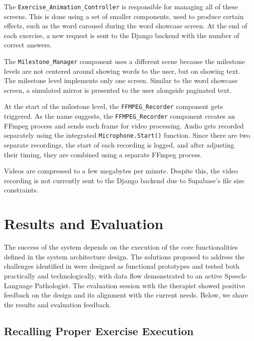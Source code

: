 The \texttt{Exercise\_Animation\_Controller} is responsible for managing all of these screens. This is done using a set of smaller components, used to produce certain effects, such as the word carousel during the word showcase screen. At the end of each exercise, a new request is sent to the Django backend with the number of correct answers.

The \texttt{Milestone\_Manager} component uses a different scene because the milestone levels are not centered around showing words to the user, but on showing text. The milestone level implements only one screen. Similar to the word showcase screen, a simulated mirror is presented to the user alongside paginated text.

At the start of the milestone level, the \texttt{FFMPEG\_Recorder} component gets triggered. As the name suggests, the \texttt{FFMPEG\_Recorder} component creates an FFmpeg process and sends each frame for video processing. Audio gets recorded separately using the integrated \texttt{Microphone.Start()} function. Since there are two separate recordings, the start of each recording is logged, and after adjusting their timing, they are combined using a separate FFmpeg process.

Videos are compressed to a few megabytes per minute. Despite this, the video recording is not currently sent to the Django backend due to Supabase's file size constraints.

\section{Results and Evaluation}
\label{sec:results-evaluation}

The success of the system depends on the execution of the core functionalities defined in the system architecture design. The solutions proposed to address the challenges identified in  were designed as functional prototypes and tested both practically and technologically, with data flow demonstrated to an active Speech-Language Pathologist. The evaluation session with the therapist showed positive feedback on the design and its alignment with the current needs. Below, we share the results and evaluation feedback.

\subsection{Recalling Proper Exercise Execution}
\label{subsec:recalling-proper-exercise-execution}

